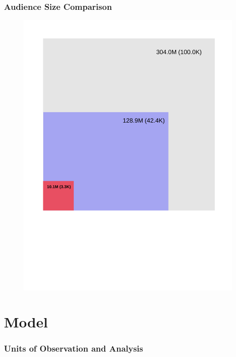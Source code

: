 \documentclass{beamer}
\begin{document}
\begin{frame}
\frametitle{Audience Size Comparison}
\begin{figure}[!h]
  \centering
  \includegraphics[scale=0.35]{panel}
\end{figure}
\end{frame}


\section{Model}

\begin{frame}
\frametitle{Units of Observation and Analysis}
\end{frame}
\end{document}

